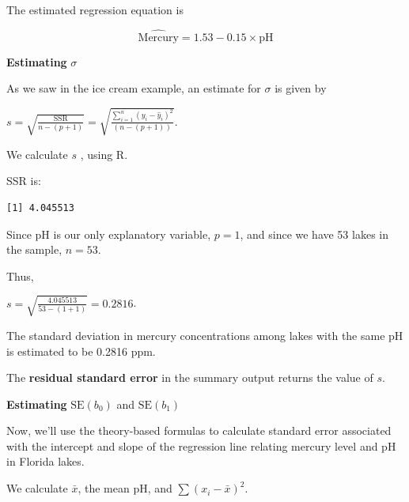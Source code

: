 \documentclass[
  letterpaper,
  DIV=11,
  numbers=noendperiod]{scrreprt}
\newenvironment{Shaded}{\begin{snugshade}}{\end{snugshade}}
\newcommand{\DecValTok}[1]{\textcolor[rgb]{0.68,0.00,0.00}{#1}}
\newcommand{\FunctionTok}[1]{\textcolor[rgb]{0.28,0.35,0.67}{#1}}
\newcommand{\NormalTok}[1]{\textcolor[rgb]{0.00,0.23,0.31}{#1}}
\newcommand{\OtherTok}[1]{\textcolor[rgb]{0.00,0.23,0.31}{#1}}
\newcommand{\SpecialCharTok}[1]{\textcolor[rgb]{0.37,0.37,0.37}{#1}}
\begin{document}
The estimated regression equation is

\[
\widehat{\text{Mercury}} = 1.53 - 0.15 \times\text{pH}
\]

\textbf{Estimating} \(\sigma\)

As we saw in the ice cream example, an estimate for \(\sigma\) is given
by

\(s =\sqrt{\frac{\text{SSR}}{n-(p+1)}} = \sqrt{\frac{\displaystyle\sum_{i=1}^n(y_i-\hat{y}_i)^2}{(n-(p+1))}}\).

We calculate \(s\) , using R.

SSR is:

\begin{Shaded}
\end{Shaded}

\begin{verbatim}
[1] 4.045513
\end{verbatim}

Since pH is our only explanatory variable, \(p=1\), and since we have 53
lakes in the sample, \(n=53\).

Thus,

\(s =\sqrt{\frac{4.045513}{53-(1+1)}} = 0.2816\).

The standard deviation in mercury concentrations among lakes with the
same pH is estimated to be 0.2816 ppm.

The \textbf{residual standard error} in the summary output returns the
value of \(s\).

\textbf{Estimating} \(\text{SE}(b_0)\) and \(\text{SE}(b_1)\)

Now, we'll use the theory-based formulas to calculate standard error
associated with the intercept and slope of the regression line relating
mercury level and pH in Florida lakes.

We calculate \(\bar{x}\), the mean pH, and \(\sum(x_i-\bar{x})^2\).

\begin{Shaded}
\end{Shaded}
\end{document}
